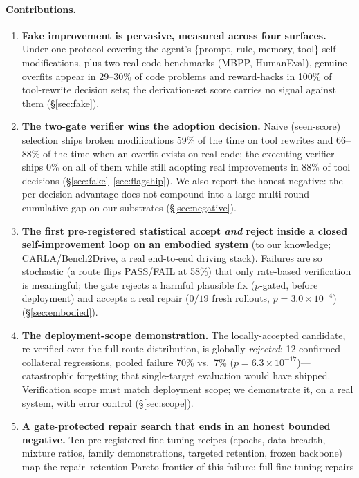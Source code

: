 \documentclass{article}
\begin{document}
\paragraph{Contributions.}
\begin{enumerate}
\item \textbf{Fake improvement is pervasive, measured across four surfaces.} Under one protocol covering
the agent's \{prompt, rule, memory, tool\} self-modifications, plus two real code benchmarks (MBPP,
HumanEval), genuine overfits appear in 29--30\% of code problems and reward-hacks in 100\% of
tool-rewrite decision sets; the derivation-set score carries no signal against them
(\S\ref{sec:fake}).
\item \textbf{The two-gate verifier wins the adoption decision.} Naive (seen-score) selection ships
broken modifications 59\% of the time on tool rewrites and 66--88\% of the time when an overfit exists
on real code; the executing verifier ships 0\% on all of them while still adopting real improvements in
88\% of tool decisions (\S\ref{sec:fake}--\ref{sec:flagship}). We also report the honest negative: the
per-decision advantage does not compound into a large multi-round cumulative gap on our substrates
(\S\ref{sec:negative}).
\item \textbf{The first pre-registered statistical accept \emph{and} reject inside a closed
self-improvement loop on an embodied system} (to our knowledge; CARLA/Bench2Drive, a real end-to-end
driving stack). Failures are so stochastic (a route flips PASS/FAIL at 58\%) that only rate-based
verification is meaningful; the gate rejects a harmful plausible fix ($p$-gated, before deployment) and
accepts a real repair ($0/19$ fresh rollouts, $p=3.0\times10^{-4}$) (\S\ref{sec:embodied}).
\item \textbf{The deployment-scope demonstration.} The locally-accepted candidate, re-verified over the
full route distribution, is globally \emph{rejected}: 12 confirmed collateral regressions, pooled
failure 70\% vs.\ 7\% ($p=6.3\times10^{-17}$)---catastrophic forgetting that single-target evaluation
would have shipped. Verification scope must match deployment scope; we demonstrate it, on a real system,
with error control (\S\ref{sec:scope}).
\item \textbf{A gate-protected repair search that ends in an honest bounded negative.} Ten pre-registered
fine-tuning recipes (epochs, data breadth, mixture ratios, family demonstrations, targeted retention,
frozen backbone) map the repair--retention Pareto frontier of this failure: full fine-tuning repairs

\end{enumerate}
\end{document}
